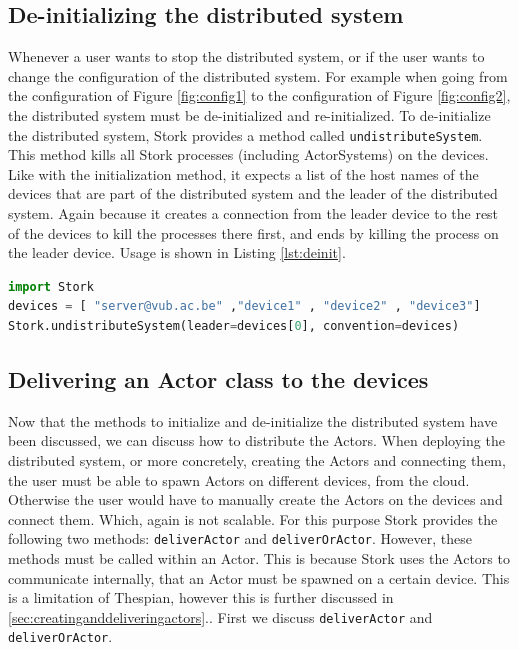 \documentclass[a4paper]{article}
\newcommand{\secref}[1]{\autoref{#1}.}
\begin{document}
\subsection{De-initializing the distributed system}
Whenever a user wants to stop the distributed system, or if the user wants to change the configuration of the distributed system. For example when going from the configuration of Figure \ref{fig:config1} to the configuration of Figure \ref{fig:config2}, the distributed system must be de-initialized and re-initialized. To de-initialize the distributed system, Stork provides a method called \lstinline{undistributeSystem}. This method kills all Stork processes (including ActorSystems) on the devices. Like with the initialization method, it expects a list of the host names of the devices that are part of the distributed system and the leader of the distributed system. Again because it creates a connection from the leader device to the rest of the devices to kill the processes there first, and ends by killing the process on the leader device. Usage is shown in Listing \ref{lst:deinit}.
\begin{lstlisting}[language=Python, caption=De-initializing the distributed system, label=lst:deinit]
import Stork
devices = [ "server@vub.ac.be" ,"device1" , "device2" , "device3"]
Stork.undistributeSystem(leader=devices[0], convention=devices)
\end{lstlisting}
\subsection{Delivering an Actor class to the devices}
Now that the methods to initialize and de-initialize the distributed system have been discussed, we can discuss how to distribute the Actors. When deploying the distributed system, or more concretely, creating the Actors and connecting them, the user must be able to spawn Actors on different devices, from the cloud. Otherwise the user would have to manually create the Actors on the devices and connect them. Which, again is not scalable. For this purpose Stork provides the following two methods: \lstinline|deliverActor| and \lstinline|deliverOrActor|. However, these methods must be called within an Actor. This is because Stork uses the Actors to communicate internally, that an Actor must be spawned on a certain device. This is a limitation of Thespian, however this is further discussed in \secref{sec:creatinganddeliveringactors}. First we discuss \lstinline|deliverActor| and \lstinline|deliverOrActor|.
\end{document}

